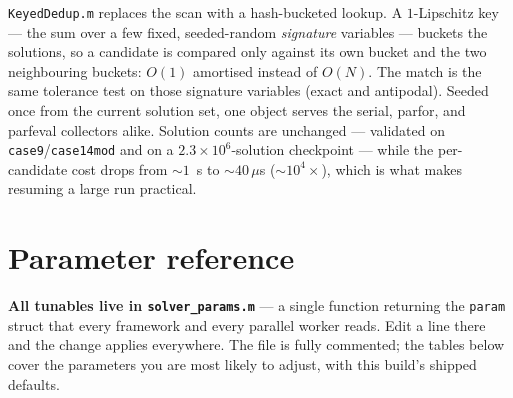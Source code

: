 \documentclass[11pt,a4paper]{article}
\newcommand{\code}[1]{\texttt{#1}}
\begin{document}
\code{KeyedDedup.m} replaces the scan with a hash-bucketed lookup. A $1$-Lipschitz key --- the
sum over a few fixed, seeded-random \emph{signature} variables --- buckets the solutions, so a
candidate is compared only against its own bucket and the two neighbouring buckets: $O(1)$
amortised instead of $O(N)$. The match is the same tolerance test on those signature
variables (exact and antipodal). Seeded once from the current solution set, one object serves
the serial, parfor, and parfeval collectors alike. Solution counts are unchanged ---
validated on \code{case9}/\code{case14mod} and on a $2.3\times10^{6}$-solution checkpoint ---
while the per-candidate cost drops from ${\sim}1$~s to ${\sim}40\,\mu$s (${\sim}10^{4}\times$),
which is what makes resuming a large run practical.

\section{Parameter reference}\label{sec:params}

\textbf{All tunables live in \code{solver_params.m}} --- a single function returning the
\code{param} struct that every framework and every parallel worker reads. Edit a line
there and the change applies everywhere. The file is fully commented; the tables below
cover the parameters you are most likely to adjust, with this build's shipped defaults.
\end{document}
